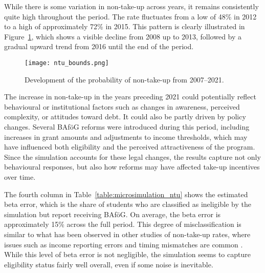 


While there is some variation in non-take-up across years, it remains consistently quite high throughout the period. 
The rate fluctuates from a low of 48\% in 2012 to a high of approximately 72\% in 2015. 
This pattern is clearly illustrated in Figure~\ref{fig:ntu_bounds_over_years}, which shows a visible decline from 2008 up to 2013, followed by a gradual upward trend from 2016 until the end of the period. 

\begin{figure}[htbp]
  \centering
  \texttt{[image: ntu\_bounds.png]}
  \caption{Development of the probability of non-take-up from 2007--2021.}
  \label{fig:ntu_bounds_over_years}
\end{figure}

The increase in non-take-up in the years preceding 2021 could potentially reflect behavioural or institutional factors such as changes in awareness, perceived complexity, or attitudes toward debt. 
It could also be partly driven by policy changes. 
Several BAföG reforms were introduced during this period, including increases in grant amounts and adjustments to income thresholds, which may have influenced both eligibility and the perceived attractiveness of the program. 
Since the simulation accounts for these legal changes, the results capture not only behavioural responses, but also how reforms may have affected take-up incentives over time.


The fourth column in Table~\ref{table:microsimulation_ntu} shows the estimated beta error, which is the share of students who are classified as ineligible by the simulation but report receiving BAföG. 
On average, the beta error is approximately 15\% across the full period. 
This degree of misclassification is similar to what has been observed in other studies of non-take-up rates, where issues such as income reporting errors and timing mismatches are common \citep{frick_claim_2007}.
While this level of beta error is not negligible, the simulation seems to capture eligibility status fairly well overall, even if some noise is inevitable.

